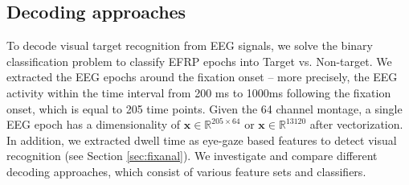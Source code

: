 \documentclass[12pt]{iopart}
\begin{document}
\subsection{Decoding approaches}
To decode visual target recognition from EEG signals,
we solve the binary classification problem to classify EFRP epochs
into Target vs. Non-target. We extracted the EEG epochs
around the fixation onset -- more precisely, the EEG activity within the time interval from
200 ms to 1000ms following the fixation onset, which is equal to 205 time points.
Given the 64 channel montage, a single EEG epoch has a dimensionality of 
$\mathbf{x} \in \mathbb{R}^{205 \times 64}$ or
$\mathbf{x} \in \mathbb{R}^{13120}$ after vectorization.
In addition, we extracted dwell time as eye-gaze based features to detect
visual recognition (see Section \ref{sec:fixanal}).
We investigate and compare different decoding approaches, which consist of 
various feature sets and classifiers.
\end{document}
